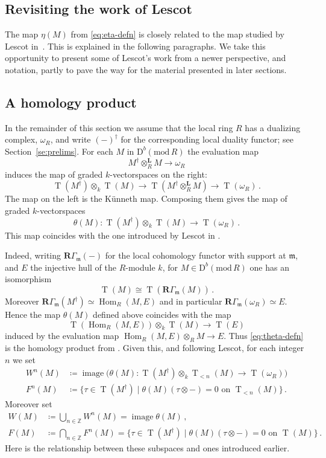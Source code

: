 \documentclass{amsart}
\numberwithin{equation}{section}
\theoremstyle{plain}
\theoremstyle{definition}
\theoremstyle{remark}
\newcommand{\dbcat}[1]{\mathrm{D}^b(\mathrm{mod}\,{#1})}
\newcommand{\bbZ}{\mathbb{Z}}
\newcommand{\Hom}{\operatorname{Hom}}
\newcommand{\image}{\operatorname{image}}
\newcommand{\rgam}{\mathbf{R}\varGamma}
\newcommand{\lotimes}{\otimes^{\mathbf L}}
\newcommand{\tee}{\operatorname{T}}
\newcommand{\fm}{\mathfrak{m}}
\begin{document}
\subsection*{Revisiting the work of Lescot}
The map $\eta(M)$ from \eqref{eq:eta-defn} is closely related to the map studied by Lescot in~\cite{Lescot:1986}. This is explained in the following paragraphs.  We take this opportunity to  present some of Lescot's work from a newer perspective, and notation, partly to pave the way for the  material presented in later sections. 

\subsection*{A homology product}
In the remainder of this section we assume that the local ring $R$ has a dualizing complex, $\omega_R$, and write $(-)^\dagger$ for the corresponding local duality functor; see Section~\ref{se:prelims}. For each $M$ in  $\dbcat R$ the evaluation map 
\[
M^\dagger \lotimes_R M \longrightarrow \omega_R
\]
induces the map of graded $k$-vectorspaces on the right:
\[
    \tee(M^\dagger)\otimes_k \tee(M)
        \longrightarrow \tee(M^\dagger \lotimes_R M)
            \longrightarrow  \tee(\omega_R)\,.
\]
The map on the left is the K\"unneth map. Composing them gives the map of graded $k$-vectorspaces
\begin{equation}
 \label{eq:theta-defn}    
\theta(M)  \colon \tee(M^\dagger )\otimes_k \tee(M) \longrightarrow \tee(\omega_R)\,.
\end{equation}
This map coincides with the one introduced by Lescot in \cite{Lescot:1986}. 

Indeed, writing $\rgam_{\fm}(-)$ for the local cohomology functor with support at $\fm$, and $E$ the injective hull of the $R$-module $k$, for $M\in\dbcat R$ one has an isomorphism
\[
\tee(M)\cong \tee(\rgam_\fm(M))\,.
\]
Moreover $\rgam_{\fm}(M^\dagger) \simeq \Hom_R(M,E)$ and in particular $\rgam_{\fm}(\omega_R)\simeq E$. Hence the map $\theta(M)$ defined above coincides with the map
\[
\tee(\Hom_R(M,E)) \otimes_k \tee(M) \to \tee(E)
\]
induced by the evaluation map $\Hom_R(M,E) \otimes_R M\to E$. Thus \eqref{eq:theta-defn} is the homology product from \cite[1.1]{Lescot:1986}. Given this, and following Lescot, for each integer $n$ we set
\begin{align*}
W^n(M)&\coloneqq \image\big(\theta(M)\colon  \tee(M^\dagger)\otimes_k \tee_{<n}(M) \to \tee(\omega_R)\big)  \\
F^n(M)& \coloneqq \{\tau\in\tee(M^\dagger)\mid \theta(M)(\tau\otimes -)=0 \text{ on } \tee_{<n}(M) \}\,.
\end{align*}
Moreover set
\begin{align*}
W(M) &\coloneqq \bigcup_{n\in\bbZ} W^n(M) = \image \theta(M)\,, \\
F(M) &\coloneqq \bigcap_{n\in\bbZ} F^n(M) = \{\tau\in\tee(M^\dagger)\mid \theta(M)(\tau\otimes -)=0 \text{ on } \tee(M) \}\,.
\end{align*}
Here is the relationship between these subspaces and ones introduced earlier.
\end{document}
